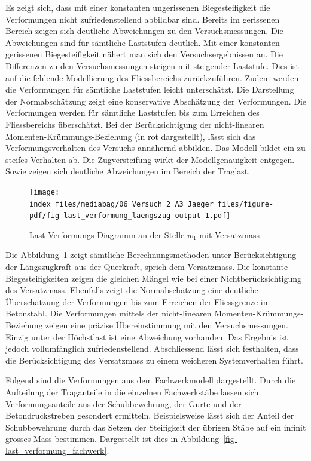 \documentclass[
  12pt,
  letterpaper,
  egregdoesnotlikesansseriftitles]{scrreprt}
\begin{document}
Es zeigt sich, dass mit einer konstanten ungerissenen Biegesteifigkeit
die Verformungen nicht zufriedenstellend abbildbar sind. Bereits im
gerissenen Bereich zeigen sich deutliche Abweichungen zu den
Versuchsmessungen. Die Abweichungen sind für sämtliche Laststufen
deutlich. Mit einer konstanten gerissenen Biegesteifigkeit nähert man
sich den Versuchsergebnissen an. Die Differenzen zu den
Versuchsmessungen steigen mit steigender Laststufe. Dies ist auf die
fehlende Modellierung des Fliessbereichs zurückzuführen. Zudem werden
die Verformungen für sämtliche Laststufen leicht unterschätzt. Die
Darstellung der Normabschätzung zeigt eine konservative Abschätzung der
Verformungen. Die Verformungen werden für sämtliche Laststufen bis zum
Erreichen des Fliessbereichs überschätzt. Bei der Berücksichtigung der
nicht-linearen Momenten-Krümmungs-Beziehung (in rot dargestellt), lässt
sich das Verformungsverhalten des Versuchs annähernd abbilden. Das
Modell bildet ein zu steifes Verhalten ab. Die Zugversteifung wirkt der
Modellgenauigkeit entgegen. Sowie zeigen sich deutliche Abweichungen im
Bereich der Traglast.

\begin{figure}[H]

{\centering \texttt{[image: index\_files/mediabag/06\_Versuch\_2\_A3\_Jaeger\_files/figure-pdf/fig-last\_verformung\_laengszug-output-1.pdf]}

}

\caption{\label{fig-last_verformung_laengszug}Last-Verformungs-Diagramm
an der Stelle \(w_1\) mit Versatzmass}

\end{figure}

Die Abbildung~\ref{fig-last_verformung_laengszug} zeigt sämtliche
Berechnungsmethoden unter Berücksichtigung der Längszugkraft aus der
Querkraft, sprich dem Versatzmass. Die konstante Biegesteifigkeiten
zeigen die gleichen Mängel wie bei einer Nichtberücksichtigung des
Versatzmass. Ebenfalls zeigt die Normabschätzung eine deutliche
Überschätzung der Verformungen bis zum Erreichen der Fliessgrenze im
Betonstahl. Die Verformungen mittels der nicht-linearen
Momenten-Krümmungs-Beziehung zeigen eine präzise Übereinstimmung mit den
Versuchsmessungen. Einzig unter der Höchstlast ist eine Abweichung
vorhanden. Das Ergebnis ist jedoch vollumfänglich zufriedenstellend.
Abschliessend lässt sich festhalten, dass die Berücksichtigung des
Versatzmass zu einem weicheren Systemverhalten führt.

Folgend sind die Verformungen aus dem Fachwerkmodell dargestellt. Durch
die Aufteilung der Traganteile in die einzelnen Fachwerkstäbe lassen
sich Verformungsanteile aus der Schubbewehrung, der Gurte und der
Betondruckstreben gesondert ermitteln. Beispielsweise lässt sich der
Anteil der Schubbewehrung durch das Setzen der Steifigkeit der übrigen
Stäbe auf ein infinit grosses Mass bestimmen. Dargestellt ist dies in
Abbildung~\ref{fig-last_verformung_fachwerk}.
\end{document}
